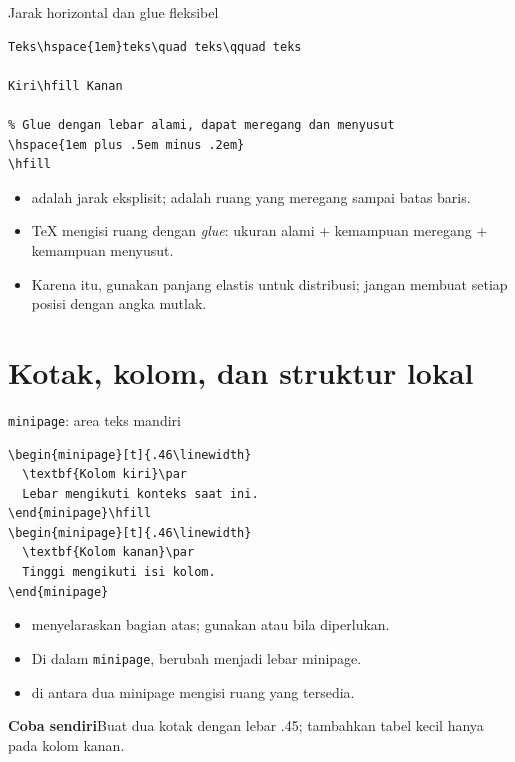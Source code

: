 \documentclass[aspectratio=169,11pt]{beamer}
\newcommand{\tugas}[1]{\par\medskip\alert{\textbf{Coba sendiri}}\quad #1}
\newcommand{\dimensi}[1]{\texttt{\detokenize{#1}}}
\begin{document}
\begin{frame}[fragile]{Jarak horizontal dan glue fleksibel}
\begin{lstlisting}
Teks\hspace{1em}teks\quad teks\qquad teks

Kiri\hfill Kanan

% Glue dengan lebar alami, dapat meregang dan menyusut
\hspace{1em plus .5em minus .2em}
\hfill
\end{lstlisting}
\begin{itemize}
  \item \dimensi{\hspace} adalah jarak eksplisit; \dimensi{\hfill} adalah ruang yang meregang sampai batas baris.
  \item TeX mengisi ruang dengan \emph{glue}: ukuran alami + kemampuan meregang + kemampuan menyusut.
  \item Karena itu, gunakan panjang elastis untuk distribusi; jangan membuat setiap posisi dengan angka mutlak.
\end{itemize}
\end{frame}

\section{Kotak, kolom, dan struktur lokal}

\begin{frame}[fragile]{\texttt{minipage}: area teks mandiri}
\begin{lstlisting}
\begin{minipage}[t]{.46\linewidth}
  \textbf{Kolom kiri}\par
  Lebar mengikuti konteks saat ini.
\end{minipage}\hfill
\begin{minipage}[t]{.46\linewidth}
  \textbf{Kolom kanan}\par
  Tinggi mengikuti isi kolom.
\end{minipage}
\end{lstlisting}
\begin{itemize}
  \item \dimensi{[t]} menyelaraskan bagian atas; gunakan \dimensi{[c]} atau \dimensi{[b]} bila diperlukan.
  \item Di dalam \texttt{minipage}, \dimensi{\linewidth} berubah menjadi lebar minipage.
  \item \dimensi{\hfill} di antara dua minipage mengisi ruang yang tersedia.
\end{itemize}
\tugas{Buat dua kotak dengan lebar .45\dimensi{\linewidth}; tambahkan tabel kecil hanya pada kolom kanan.}
\end{frame}
\end{document}
